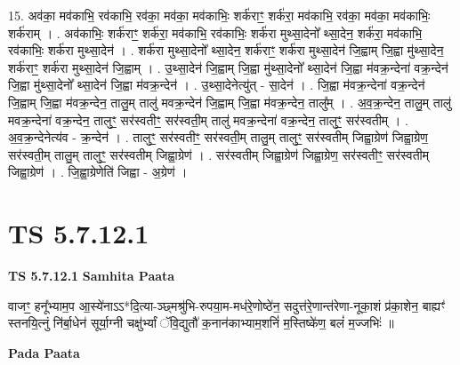 \documentclass[17pt]{extarticle}
\begin{document}
15. अव॑का॒ मव॑काभि॒ रव॑काभि॒ रव॑का॒ मव॑का॒ मव॑काभिः॒ शर्क॑राꣳ॒॒ शर्क॑रा॒ मव॑काभि॒ रव॑का॒ मव॑का॒ मव॑काभिः॒ शर्क॑राम् । . अव॑काभिः॒ शर्क॑राꣳ॒॒ शर्क॑रा॒ मव॑काभि॒ रव॑काभिः॒ शर्क॑रा मुथ्सा॒देनो᳚ थ्सा॒देन॒ शर्क॑रा॒ मव॑काभि॒ रव॑काभिः॒ शर्क॑रा मुथ्सा॒देन॑ । . शर्क॑रा मुथ्सा॒देनो᳚ थ्सा॒देन॒ शर्क॑राꣳ॒॒ शर्क॑रा मुथ्सा॒देन॑ जि॒ह्वाम् जि॒ह्वा मु॑थ्सा॒देन॒ शर्क॑राꣳ॒॒ शर्क॑रा मुथ्सा॒देन॑ जि॒ह्वाम् । . उ॒थ्सा॒देन॑ जि॒ह्वाम् जि॒ह्वा मु॑थ्सा॒देनो᳚ थ्सा॒देन॑ जि॒ह्वा म॑वक्र॒न्देना॑ वक्र॒न्देन॑ जि॒ह्वा मु॑थ्सा॒देनो᳚ थ्सा॒देन॑ जि॒ह्वा म॑वक्र॒न्देन॑ । . उ॒थ्सा॒देनेत्यु॑त् - सा॒देन॑ । . जि॒ह्वा म॑वक्र॒न्देना॑ वक्र॒न्देन॑ जि॒ह्वाम् जि॒ह्वा म॑वक्र॒न्देन॒ तालु॒म् तालु॑ मवक्र॒न्देन॑ जि॒ह्वाम् जि॒ह्वा म॑वक्र॒न्देन॒ तालु᳚म् । . अ॒व॒क्र॒न्देन॒ तालु॒म् तालु॑ मवक्र॒न्देना॑ वक्र॒न्देन॒ तालुꣳ॒॒ सर॑स्वतीꣳ॒॒ सर॑स्वती॒म् तालु॑ मवक्र॒न्देना॑ वक्र॒न्देन॒ तालुꣳ॒॒ सर॑स्वतीम् । . अ॒व॒क्र॒न्देनेत्य॑व - क्र॒न्देन॑ । . तालुꣳ॒॒ सर॑स्वतीꣳ॒॒ सर॑स्वती॒म् तालु॒म् तालुꣳ॒॒ सर॑स्वतीम् जिह्वा॒ग्रेण॑ जिह्वा॒ग्रेण॒ सर॑स्वती॒म् तालु॒म् तालुꣳ॒॒ सर॑स्वतीम् जिह्वा॒ग्रेण॑ । . सर॑स्वतीम् जिह्वा॒ग्रेण॑ जिह्वा॒ग्रेण॒ सर॑स्वतीꣳ॒॒ सर॑स्वतीम् जिह्वा॒ग्रेण॑ । . जि॒ह्वा॒ग्रेणेति॑ जिह्वा - अ॒ग्रेण॑ । \newline
\pagebreak
{}

\section{ TS 5.7.12.1 }

\textbf{TS 5.7.12.1 } \newline
\textbf{Samhita Paata} \newline

वाजꣳ॒॒ हनू᳚भ्याम॒प आ॒स्ये॑नाऽऽ*दि॒त्या-ञ्छ्मश्रु॑भि-रुपया॒म-मध॑रे॒णोष्ठे॑न॒ सदुत्त॑रे॒णान्त॑रेणा-नूका॒शं प्र॑का॒शेन॒ बाह्यꣳ॑ स्तनयि॒त्नुं नि॑र्बा॒धेन॑ सूर्या॒ग्नी चक्षु॑र्भ्यां ॅवि॒द्युतौ॑ क॒नान॑काभ्याम॒शनिं॑ म॒स्तिष्के॑ण॒ बलं॑ म॒ज्जभिः॑ ॥ \newline

\textbf{Pada Paata} \newline
\end{document}
